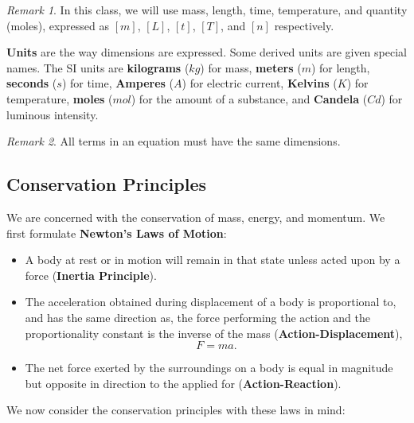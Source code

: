 \documentclass[11pt]{article}
\theoremstyle{plain} %
\theoremstyle{definition}
\theoremstyle{example}
\theoremstyle{remark}
\newtheorem*{remark}{Remark}
\begin{document}
\begin{remark}
In this class, we will use mass, length, time, temperature, and quantity (moles), expressed as 
$[m]$, $[L]$, $[t]$, $[T]$, and $[n]$ respectively. 
\end{remark}

\textbf{Units} are the way dimensions are expressed. Some derived units are given special names. The SI units are \textbf{kilograms} ($kg$) for mass, \textbf{meters} ($m$) for length, \textbf{seconds} ($s$) for time, \textbf{Amperes} ($A$) for electric current, \textbf{Kelvins} ($K$) for temperature, \textbf{moles} ($mol$) for the amount of a substance, and \textbf{Candela} ($Cd$) for luminous intensity. 

\begin{remark}
All terms in an equation must have the same dimensions. 
\end{remark}

\subsection{Conservation Principles}

We are concerned with the conservation of mass, energy, and momentum. We first formulate \textbf{Newton's Laws of Motion}:
\begin{itemize}
			\item A body at rest or in motion will remain in that state unless acted upon by a force (\textbf{Inertia Principle}). 
			\item The acceleration obtained during displacement of a body is proportional to, and has the same direction as, the force performing the action and the proportionality constant is the inverse of the mass (\textbf{Action-Displacement}), 
			$$F = ma.$$
			\item The net force exerted by the surroundings on a body is equal in magnitude but opposite in direction to the applied for (\textbf{Action-Reaction}).
		\end{itemize}
		
We now consider the conservation principles with these laws in mind:
		
\end{document}

